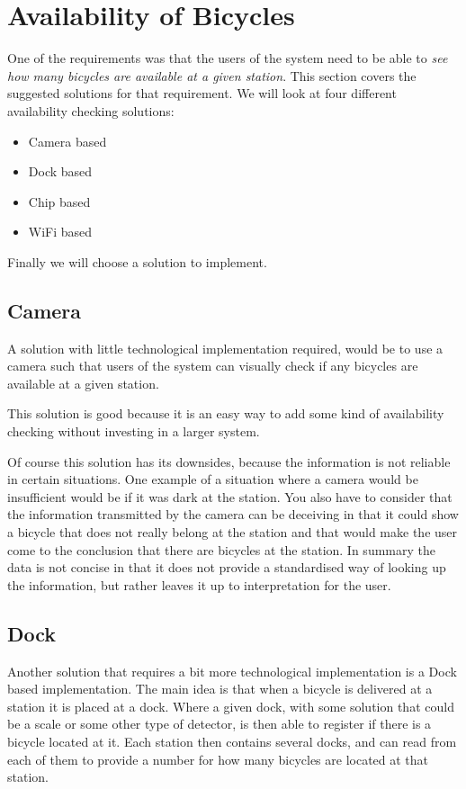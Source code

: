\section{Availability of Bicycles}\label{sec:availability}
One of the requirements was that the users of the system need to be able to \textit{see how many bicycles are available at a given station}.
This section covers the suggested solutions for that requirement.
We will look at four different availability checking solutions:

\begin{itemize}
\item Camera based
\item Dock based
\item Chip based
\item WiFi based
\end{itemize} 

Finally we will choose a solution to implement.

\subsection{Camera}
A solution with little technological implementation required, would be to use a camera such that users of the system can visually check if any bicycles are available at a given station. 

This solution is good because it is an easy way to add some kind of availability checking without investing in a larger system.

Of course this solution has its downsides, because the information is not reliable in certain situations. 
One example of a situation where a camera would be insufficient would be if it was dark at the station.
You also have to consider that the information transmitted by the camera can be deceiving in that it could show a bicycle that does not really belong at the station and that would make the user come to the conclusion that there are bicycles at the station.
In summary the data is not concise in that it does not provide a standardised way of looking up the information, but rather leaves it up to interpretation for the user.

\subsection{Dock}
Another solution that requires a bit more technological implementation is a Dock based implementation.
The main idea is that when a bicycle is delivered at a station it is placed at a dock.
Where a given dock, with some solution that could be a scale or some other type of detector, is then able to register if there is a bicycle located at it.
Each station then contains several docks, and can read from each of them to provide a number for how many bicycles are located at that station. 

